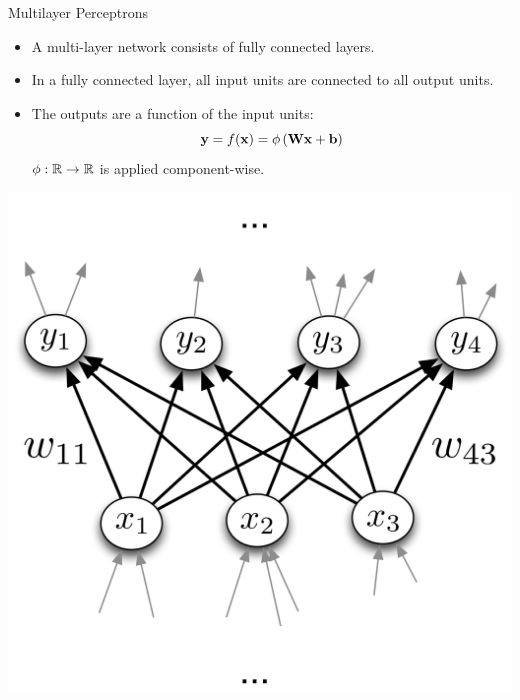 \documentclass[11pt,handout,aspectratio=169]{beamer}
\begin{document}
\begin{frame}{Multilayer Perceptrons}
\begin{itemize}
\item A multi-layer network consists of fully connected layers.
\item In a fully connected layer, all input units are connected to 
all output units.
\pause
\item The outputs are a function of the input units:
        \[ \mathbf{y} = f(\mathbf{x}) = \phi \left( \mathbf{W} \mathbf{x} + \mathbf{b} \right) \]
        $\phi:\mathbb R\to \mathbb R$ is applied \alert{component-wise}.
\end{itemize}
\vspace{-4mm}
\begin{center}
  \includegraphics[width=0.3\linewidth]{pics/fc_layer.png}
\end{center}
\end{frame}
\end{document}
